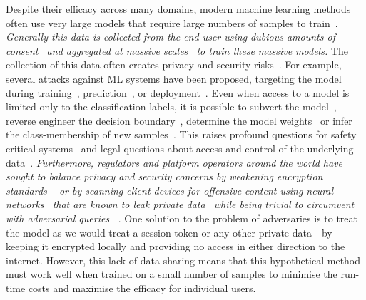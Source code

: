 \documentclass[conference]{IEEEtran}
\newcommand{\cm}[1]{\textit{{\color{blue}#1}}}
\begin{document}
Despite their efficacy across many domains, modern machine learning methods often use very large models that require large numbers of samples to train~\cite{desislavov2021compute}.  
\cm{Generally this data is collected from the end-user using dubious amounts of consent~\cite{nouwens2020dark} and aggregated at massive scales~\cite{desislavov2021compute} to train these massive models.} 
The collection of this data often creates privacy and security risks~\cite{chakraborty_adversarial_2018,meyers}. 
For example, several attacks against ML systems have been proposed, targeting the model during training~\cite{biggio_poisoning_2013}, prediction~\cite{biggio_evasion_2013,deepfool,carlini_towards_2017}, or deployment~\cite{distributed_attacks,santos2021universal}.
Even when access to a model is limited only to the classification labels, it is possible to subvert the model~\cite{hopskipjump}, reverse engineer the decision boundary~\cite{deepfool}, determine the model weights~\cite{jagielski2020high} or infer the class-membership of new samples~\cite{bentley2020quantifying}. 
This raises profound questions for safety critical systems~\cite{meyers} and legal questions about access and control of the underlying data~\cite{mitrou2018data,marks2023ai}. 
\cm{
Furthermore, regulators and platform operators around the world have sought to balance privacy and security concerns by weakening encryption standards ~\cite{amnesty_encryption} or by scanning client devices for offensive content using neural networks~\cite{chat_control} that are known to leak private data~\cite{xiao2021improving,fredrikson_model_2015} while being trivial to circumvent with adversarial queries ~\cite{carlini_towards_2017,dohmatob_generalized_2019,hopskipjump,biggio_evasion_2013,meyers,chakraborty_adversarial_2018}.
}
One solution to the problem of adversaries is to treat the model as we would treat a session token or any other private data---by keeping it encrypted locally and providing no access in either direction to the internet.
However, this lack of data sharing means that this hypothetical method must work well when trained on a small number of samples to minimise the run-time costs and maximise the efficacy for individual users.
\end{document}

